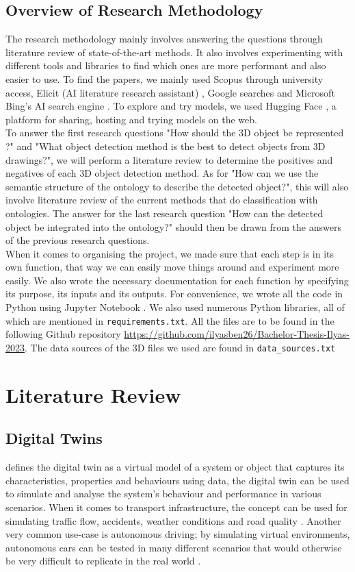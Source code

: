 \documentclass[a4paper,11pt,oneside]{article}
\begin{document}
   
  \subsection{Overview of Research Methodology}
  The research methodology mainly involves answering the questions through literature review of state-of-the-art methods. It also involves experimenting with different tools and libraries to find which ones are more performant and also easier to use. To find the papers, we mainly used Scopus \cite{scopus} through university access, Elicit (AI literature research assistant) \cite{elicit}, Google searches and Microsoft Bing's AI search engine \cite{BingAI}. To explore and try models, we used Hugging Face \cite{huggingface}, a platform for sharing, hosting and trying models on the web. \\
  To answer the first research questions "How should the 3D object be represented ?" and "What object detection method is the best to detect objects from 3D drawings?", we will perform a literature review to determine the positives and negatives of each 3D object detection method. As for "How can we use the semantic structure of the ontology to describe the detected object?", this will also involve literature review of the current methods that do classification with ontologies. The answer for the last research question "How can the detected object be integrated into the ontology?" should then be drawn from the answers of the previous research questions.\\
  When it comes to organising the project, we made sure that each step is in its own function, that way we can easily move things around and experiment more easily. We also wrote the necessary documentation for each function by specifying its purpose, its inputs and its outputs. For convenience, we wrote all the code in Python \cite{python} using Jupyter Notebook \cite{Kluyver2016jupyter}. We also used numerous Python libraries, all of which are mentioned in \texttt{requirements.txt}. All the files are to be found in the following Github repository \url{https://github.com/ilyasben26/Bachelor-Thesis-Ilyas-2023}. The data sources of the 3D files we used are found in \texttt{data\_sources.txt}
  \section{Literature Review}
  \subsection{Digital Twins} 
  \cite{DTdefinition} defines the digital twin as a virtual model of a system or object that captures its characteristics, properties and behaviours using data, the digital twin can be used to simulate and analyse the system's behaviour and performance in various scenarios.
  When it comes to transport infrastructure, the concept can be used for simulating traffic flow, accidents, weather conditions and road quality \cite{9540108}. Another very common use-case is autonomous driving; by simulating virtual environments, autonomous cars can be tested in many different scenarios that would otherwise be very difficult to replicate in the real world \cite{inproceedings}. 
\end{document}
